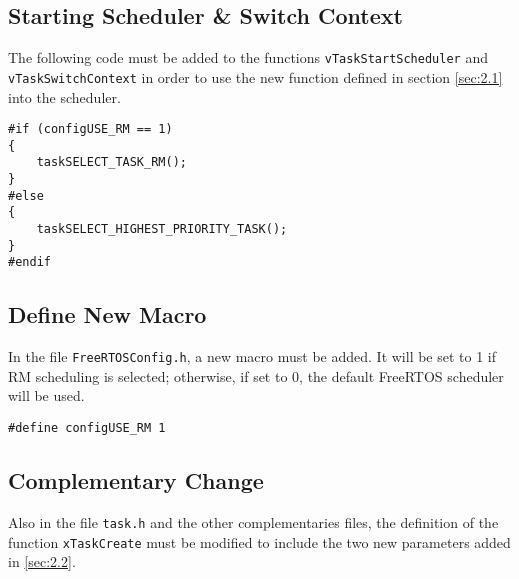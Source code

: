 \subsection{Starting Scheduler \& Switch Context}
The following code must be added to the functions \texttt{vTaskStartScheduler} and \texttt{vTaskSwitchContext} in order to use the new function defined in section \ref{sec:2.1} into the scheduler.
\begin{lstlisting}
#if (configUSE_RM == 1)
{
    taskSELECT_TASK_RM();
}
#else
{
    taskSELECT_HIGHEST_PRIORITY_TASK();
}
#endif
\end{lstlisting}

\subsection{Define New Macro}
In the file \texttt{FreeRTOSConfig.h}, a new macro must be added. It will be set to 1 if RM scheduling is selected; otherwise, if set to 0, the default FreeRTOS scheduler will be used.
\begin{lstlisting}
#define configUSE_RM 1
\end{lstlisting}

\subsection{Complementary Change}
Also in the file \texttt{task.h} and the other complementaries files, the definition of the function \texttt{xTaskCreate} must be modified to include the two new parameters added in \ref{sec:2.2}.